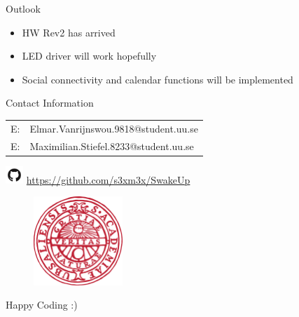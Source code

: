 \documentclass[apectratio=169]{beamer}
\begin{document}
  	\begin{frame}{Outlook}	
		\begin{itemize}
			\item<1-> HW Rev2 has arrived
			\item<2-> LED driver will work hopefully
			\item<3-> Social connectivity and calendar functions will be implemented
		\end{itemize}
	\end{frame}

  	\begin{frame}{Contact Information}
        	\begin{center}
                \begin{table}[]
                        \begin{tabular}{ll}
                                E: & Elmar.Vanrijnswou.9818@student.uu.se \\
                                E: & Maximilian.Stiefel.8233@student.uu.se\\
                        \end{tabular}
                \end{table}
                \includegraphics[width=0.05\textwidth]{./fig/github} \hspace{0.1cm} \url{https://github.com/s3xm3x/SwakeUp}\\
        	\end{center}
        	\begin{figure}
                	\includegraphics[width=0.3\textwidth]{./fig/logo}
        	\end{figure}
  	\end{frame}


  \begin{frame}[standout]
	Happy Coding :) 
  \end{frame}
\end{document}

